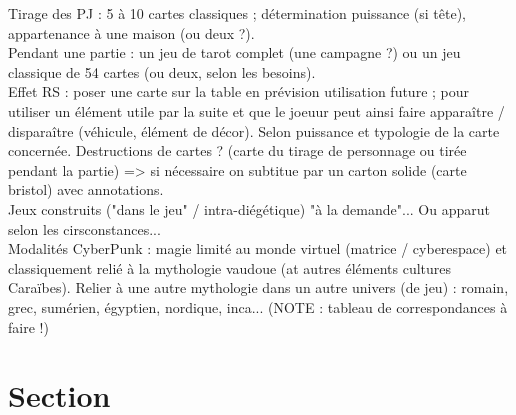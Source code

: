 \documentclass[11pt,twoside,a4paper]{article}
\begin{document}
Tirage des PJ : 5 {\`a} 10 cartes classiques ; d{\'e}termination puissance (si t{\^e}te), appartenance {\`a} une maison (ou deux ?). ~\\

Pendant une partie : un jeu de tarot complet (une campagne ?) ou un jeu classique de 54 cartes (ou deux, selon les besoins).~\\

Effet RS : poser une carte sur la table en pr{\'e}vision utilisation future ; pour utiliser un {\'e}l{\'e}ment utile par la suite et que le joeuur peut ainsi faire appara{\^i}tre / dispara{\^i}tre (v{\'e}hicule, {\'e}l{\'e}ment de d{\'e}cor). Selon puissance et typologie de la carte concern{\'e}e. 
Destructions de cartes ? (carte du tirage de personnage ou tir{\'e}e pendant la partie) => si n{\'e}cessaire on subtitue par un carton solide (carte bristol) avec annotations.~\\

Jeux construits ("dans le jeu" / intra-di{\'e}g{\'e}tique) "{\`a} la demande"... Ou apparut selon les cirsconstances... ~\\

Modalit{\'e}s CyberPunk : magie limit{\'e} au monde virtuel (matrice / cyberespace) et classiquement reli{\'e} {\`a} la mythologie vaudoue (at autres {\'e}l{\'e}ments cultures Cara{\"i}bes). 
Relier {\`a} une autre mythologie dans un autre univers (de jeu) : romain, grec, sum{\'e}rien, {\'e}gyptien, nordique, inca... (NOTE : tableau de correspondances {\`a} faire !)




\clearpage


\section{Section}
\end{document}
